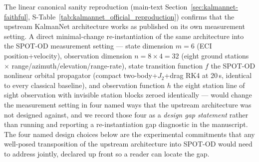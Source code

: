 \documentclass{article}
\begin{document}
The linear canonical sanity reproduction (main-text Section~\ref{sec:kalmannet-faithful}, S-Table~\ref{tab:kalmannet_official_reproduction}) confirms that the upstream KalmanNet architecture works as published on its own measurement setting. A direct minimal-change re-instantiation of the same architecture into the SPOT-OD measurement setting --- state dimension $m=6$ (ECI position+velocity), observation dimension $n=8\times4=32$ (eight ground stations $\times$ range/azimuth/elevation/range-rate), state transition function $f$ the SPOT-OD nonlinear orbital propagator (compact two-body+$J_2$+drag RK4 at 20\,s, identical to every classical baseline), and observation function $h$ the eight station line of sight observation with invisible station blocks zeroed identically --- would change the measurement setting in four named ways that the upstream architecture was not designed against, and we record those four as a \emph{design gap statement} rather than running and reporting a re-instantiation gap diagnostic in the manuscript. The four named design choices below are the experimental commitments that any well-posed transposition of the upstream architecture into SPOT-OD would need to address jointly, declared up front so a reader can locate the gap.
\end{document}
